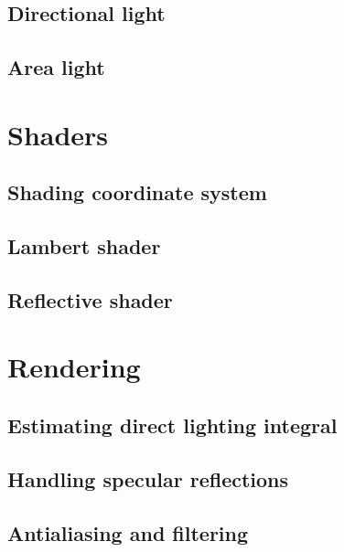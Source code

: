 \subsection{Directional light}

\subsection{Area light}

\section{Shaders}

\subsection{Shading coordinate system}

\subsection{Lambert shader}

\subsection{Reflective shader}

\section{Rendering}

\subsection{Estimating direct lighting integral}

\subsection{Handling specular reflections}

\subsection{Antialiasing and filtering}



